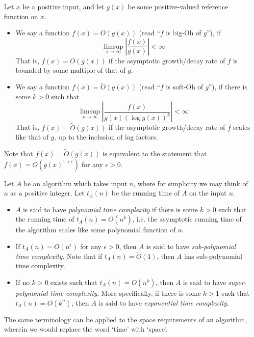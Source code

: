 \documentclass[10pt]{article}
\begin{document}
\begin{definition}
Let $x$ be a positive input, and let $g(x)$ be some positive-valued reference function on $x$.
\begin{itemize}
\item We say a function $f(x) = O(g(x))$ (read ``$f$ is big-Oh of $g$''), if
\begin{equation}
\limsup_{x \to \infty} \left| \frac{f(x)}{g(x)}\right| < \infty
\end{equation}
That is, $f(x) = O(g(x))$ if the asymptotic growth/decay rate of $f$ is bounded by some multiple of that of $g$.
\item We say a function $f(x) = \tilde{O}(g(x))$ (read ``$f$ is soft-Oh of $g$''), if there is some $k>0$ such that
\begin{equation}
\limsup_{x \to \infty} \left| \frac{f(x)}{g(x)\left(\log g(x)\right)^k}\right| < \infty
\end{equation}
That is, $f(x) = \tilde{O}(g(x))$ if the asymptotic growth/decay rate of $f$ scales like that of $g$, up to the inclusion of log factors.
\end{itemize}
\end{definition}
Note that $f(x) = \tilde{O}(g(x))$ is equivalent to the statement that $f(x) = O(g(x)^{1+\epsilon})$ for any $\epsilon>0$. \\

\begin{definition}
Let $A$ be an algorithm which takes input $n$, where for simplicity we may think of $n$ as a positive integer. Let $t_A(n)$ be the running time of $A$ on the input $n$.
\begin{itemize}
\item $A$ is said to have {\it polynomial time complexity} if there is some $k>0$ such that the running time of $t_A(n) = O(n^{k})$, i.e. the asymptotic running time of the algorithm scales like some polynomial function of $n$.
\item If $t_A(n) = O(n^{\epsilon})$ for any $\epsilon>0$, then $A$ is said to have {\it sub-polynomial time complexity}. Note that if $t_A(n) = \tilde{O}(1)$, then $A$ has sub-polynomial time complexity.
\item If no $k>0$ exists such that $t_A(n) = O(n^k)$, then $A$ is said to have {\it super-polynomial time complexity}. More specifically, if there is some $k>1$ such that $t_A(n) = O(k^n)$, then $A$ is said to have {\it exponential time complexity}.
\end{itemize}
\end{definition}
The same terminology can be applied to the space requirements of an algorithm, wherein we would replace the word `time' with `space'.
\end{document}
